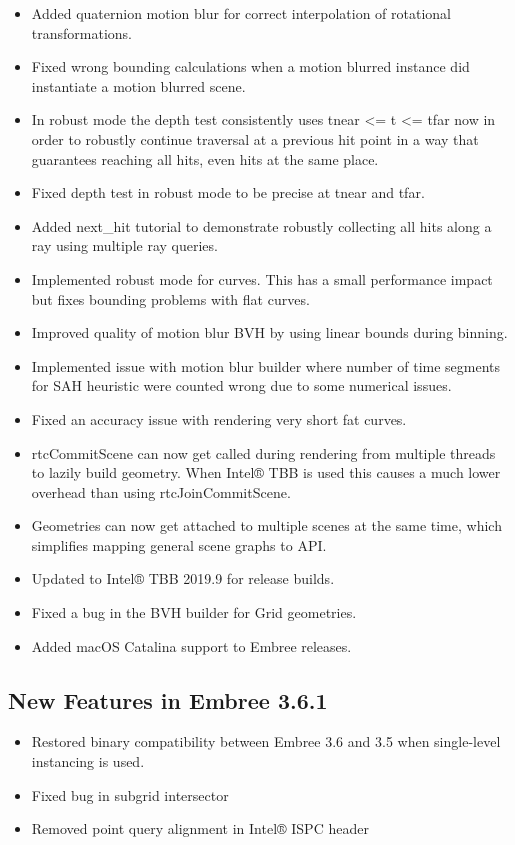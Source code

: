 \begin{itemize}
\tightlist
\item
  Added quaternion motion blur for correct interpolation of rotational
  transformations.
\item
  Fixed wrong bounding calculations when a motion blurred instance did
  instantiate a motion blurred scene.
\item
  In robust mode the depth test consistently uses tnear \textless= t
  \textless= tfar now in order to robustly continue traversal at a
  previous hit point in a way that guarantees reaching all hits, even
  hits at the same place.
\item
  Fixed depth test in robust mode to be precise at tnear and tfar.
\item
  Added next\_hit tutorial to demonstrate robustly collecting all hits
  along a ray using multiple ray queries.
\item
  Implemented robust mode for curves. This has a small performance
  impact but fixes bounding problems with flat curves.
\item
  Improved quality of motion blur BVH by using linear bounds during
  binning.
\item
  Implemented issue with motion blur builder where number of time
  segments for SAH heuristic were counted wrong due to some numerical
  issues.
\item
  Fixed an accuracy issue with rendering very short fat curves.
\item
  rtcCommitScene can now get called during rendering from multiple
  threads to lazily build geometry. When Intel® TBB is used this causes
  a much lower overhead than using rtcJoinCommitScene.
\item
  Geometries can now get attached to multiple scenes at the same time,
  which simplifies mapping general scene graphs to API.
\item
  Updated to Intel® TBB 2019.9 for release builds.
\item
  Fixed a bug in the BVH builder for Grid geometries.
\item
  Added macOS Catalina support to Embree releases.
\end{itemize}

\subsection{New Features in Embree
3.6.1}\label{new-features-in-embree-3.6.1}

\begin{itemize}
\tightlist
\item
  Restored binary compatibility between Embree 3.6 and 3.5 when
  single-level instancing is used.
\item
  Fixed bug in subgrid intersector
\item
  Removed point query alignment in Intel® ISPC header
\end{itemize}

